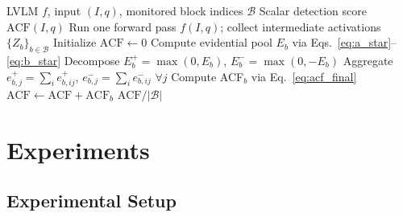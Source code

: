 \documentclass[preprint,12pt]{elsarticle}
\begin{document}
\begin{algorithm}[t]
\caption{Single-Pass ACF Detection}
\label{alg:acf}
\begin{algorithmic}[1]
\Require LVLM $f$, input $(I, q)$, monitored block indices $\mathcal{B}$
\Ensure Scalar detection score $\text{ACF}(I, q)$
\State Run one forward pass $f(I, q)$; collect intermediate activations $\{Z_b\}_{b \in \mathcal{B}}$
\State Initialize $\text{ACF} \gets 0$
    \State Compute evidential pool $E_b$ via Eqs.~\eqref{eq:a_star}--\eqref{eq:b_star}
    \State Decompose $E_b^+ = \max(0, E_b)$, $E_b^- = \max(0, -E_b)$
    \State Aggregate $e^+_{b,j} = \sum_i e^+_{b,ij}$, $e^-_{b,j} = \sum_i e^-_{b,ij}$ $\forall j$
    \State Compute ACF$_b$ via Eq.~\eqref{eq:acf_final}
    \State $\text{ACF} \gets \text{ACF} + \text{ACF}_b$
\EndFor
\State \Return $\text{ACF} / |\mathcal{B}|$
\end{algorithmic}
\end{algorithm}

\FloatBarrier
\section{Experiments}

\subsection{Experimental Setup}
\label{sec:exp_setup}
\end{document}
